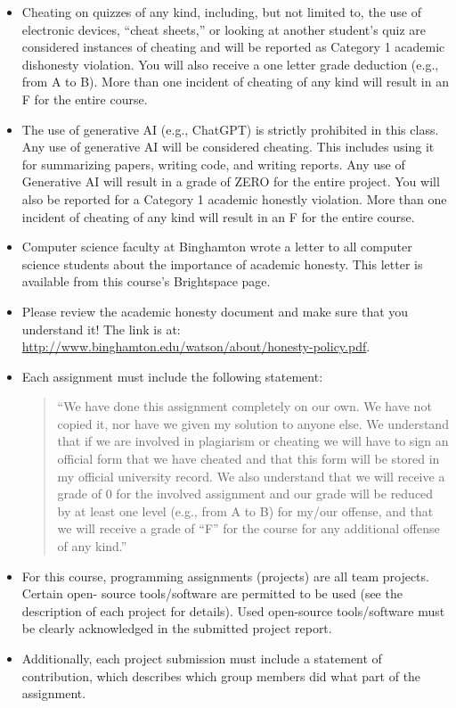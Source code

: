 \documentclass[11pt,article,oneside]{memoir} %
\begin{document}
\begin{itemize}
    \item Cheating on quizzes of any kind, including, but not limited to, the use of electronic devices, ``cheat sheets,'' or looking at another student's quiz are considered instances of cheating and will be reported as Category 1 academic dishonesty violation. You will also receive a one letter grade deduction (e.g., from A to B). More than one incident of cheating of any kind will result in an F for the entire course.
    \item The use of generative AI (e.g., ChatGPT) is strictly prohibited in this class. Any use of generative AI will be considered cheating. This includes using it for summarizing papers, writing code, and writing reports. Any use of Generative AI will result in a grade of ZERO for the entire project. You will also be reported for a Category 1 academic honestly violation. More than one incident of cheating of any kind will result in an F for the entire course.
    \item Computer science faculty at Binghamton wrote a letter to all computer science students about the importance of academic honesty. This letter is available from this course's Brightspace page.
    \item Please review the academic honesty document and make sure that you understand it! The link is at: \url{http://www.binghamton.edu/watson/about/honesty-policy.pdf}.
    \item Each assignment must include the following statement:
    \begin{quote}
        ``We have done this assignment completely on our own. We have not copied it, nor have we given my solution to anyone else. We understand that if we are involved in plagiarism or cheating we will have to sign an official form that we have cheated and that this form will be stored in my official university record. We also understand that we will receive a grade of 0 for the involved assignment and our grade will be reduced by at least one level (e.g., from A to B) for my/our offense, and that we will receive a grade of ``F'' for the course for any additional offense of any kind.''
    \end{quote}
    \item For this course, programming assignments (projects) are all team projects. Certain open- source tools/software are permitted to be used (see the description of each project for details). Used open-source tools/software must be clearly acknowledged in the submitted project report.
    \item Additionally, each project submission must include a statement of contribution, which describes which group members did what part of the assignment.
\end{itemize}
\end{document}
